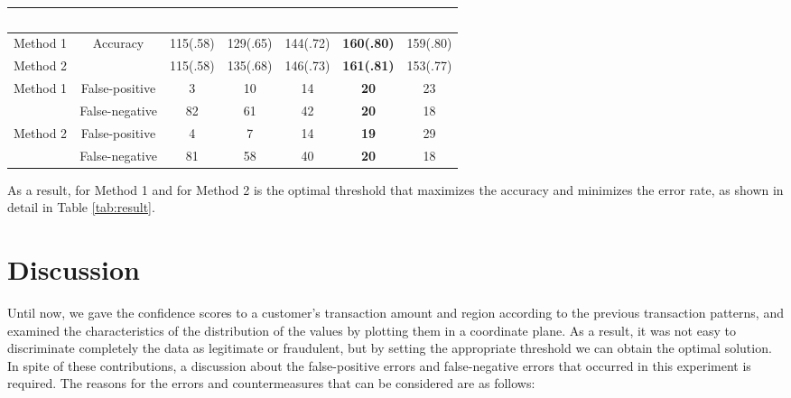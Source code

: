 \documentclass[final,authoryear,5p,times,twocolumn]{elsarticle}
\begin{document}
\begin{table*}[t!]
\begin{center}
    \begin{tabular}{|cc|ccccc|}
    \hline
    ~        & ~              &  &  &  &  &  \\ \hline
    Method 1 & Accuracy       & 115(.58)          & 129(.65)          & 144(.72)          & \textbf{160(.80)} & 159(.80)   \\
    Method 2 & ~              & 115(.58)           & 135(.68)          & 146(.73)          & \textbf{161(.81)}& 153(.77)   \\ \hline
    Method 1 & False-positive & 3        & 10        & 14        & \textbf{20}     & 23      \\
    ~        & False-negative & 82       & 61        & 42        & \textbf{20}     & 18      \\
    Method 2 & False-positive & 4        & 7         & 14        & \textbf{19}     & 29      \\
    ~        & False-negative & 81       & 58        & 40        & \textbf{20}     & 18      \\ \hline
    \end{tabular}
    \caption {The accuracy and error rate of each method. Method 1 is a combination method of association rule and GPs (i.e., rectangular markers in Figs. \ref{fig:result7} and \ref{fig:result8}). Method 2 is a combination method of association rule and  (i.e., circle markers in Figs. \ref{fig:result7} and \ref{fig:result8}). We determined the optimal thresholds with the highest accuracy and the lowest error rates, indicated in bold type.}
    \label{tab:result}
\end{center}
\end{table*}

As a result,  for Method 1 and  for Method 2 is the optimal threshold that maximizes the accuracy and minimizes the error rate, as shown in detail in Table \ref{tab:result}.

\section{Discussion}
\label{section:Sec6}
Until now, we gave the confidence scores to a customer's transaction amount and region according to the previous transaction patterns, and examined the characteristics of the distribution of the values by plotting them in a coordinate plane. As a result, it was not easy to discriminate completely the data as legitimate or fraudulent, but by setting the appropriate threshold we can obtain the optimal solution. In spite of these contributions, a discussion about the false-positive errors and false-negative errors that occurred in this experiment is required. The reasons for the errors and countermeasures that can be considered are as follows:
\end{document}
